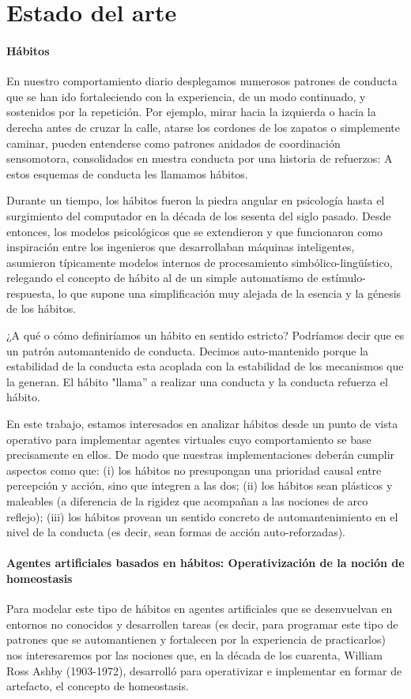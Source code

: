 \chapter{Estado del arte}
\subsubsection{Hábitos}
En nuestro comportamiento diario desplegamos numerosos patrones de conducta que se han ido fortaleciendo con la experiencia, de un modo continuado, y sostenidos por la repetición. Por ejemplo, mirar hacia la izquierda o hacia la derecha antes de cruzar la calle, atarse los cordones de los zapatos o simplemente caminar, pueden entenderse como patrones anidados de coordinación sensomotora, consolidados en nuestra conducta por una historia de refuerzos: A estos esquemas de conducta les llamamos hábitos.

Durante un tiempo, los hábitos fueron la piedra angular en psicología hasta el surgimiento del computador en la década de los sesenta del siglo pasado. Desde entonces, los modelos psicológicos que se extendieron y que funcionaron como inspiración entre los ingenieros que desarrollaban máquinas inteligentes, asumieron típicamente modelos internos de procesamiento simbólico-lingüístico, relegando el concepto de hábito al de un simple automatismo de estímulo-respuesta, lo que supone una simplificación muy alejada de la esencia y la génesis de los hábitos.

¿A qué o cómo definiríamos un hábito en sentido estricto? Podríamos decir que es un patrón automantenido de conducta. Decimos auto-mantenido porque la estabilidad de la conducta esta acoplada con la estabilidad de los mecanismos que la generan. El hábito "llama” a realizar una conducta y la conducta refuerza el hábito.

En este trabajo, estamos interesados en analizar hábitos desde un punto de vista operativo para implementar agentes virtuales cuyo comportamiento se base precisamente en ellos. De modo que nuestras implementaciones deberán cumplir aspectos como que: (i) los hábitos no presupongan una prioridad causal entre percepción y acción, sino que integren a las dos; (ii) los hábitos sean plásticos y maleables (a diferencia de la rigidez que acompañan a las nociones de arco reflejo); (iii) los hábitos provean un sentido concreto de automantenimiento en el nivel de la conducta (es decir, sean formas de acción auto-reforzadas).

\subsubsection{Agentes artificiales basados en hábitos: Operativización de la noción de homeostasis}
Para modelar este tipo de hábitos en agentes artificiales que se desenvuelvan en entornos no conocidos y desarrollen tareas (es decir, para programar este tipo de patrones que se automantienen y fortalecen por la experiencia de practicarlos) nos interesaremos por las nociones que, en la década de los cuarenta, William Ross Ashby (1903-1972), desarrolló para operativizar e implementar en formar de artefacto, el concepto de homeostasis.

